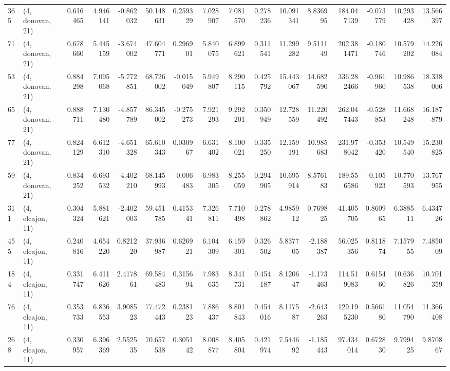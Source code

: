 \begin{tabular}{llrrrrrrrrrrrrrr}
365 &  (4, donovan, 21) &   0.616465 &   4.946141 &  -0.862032 &    50.148631 &   0.259329 &   7.028907 &   7.081570 &  0.278236 &  10.091341 &   8.836995 &   184.047139 & -0.073779 &  10.293428 &  13.566397 \\
71  &  (4, donovan, 21) &   0.678660 &   5.445159 &  -3.674002 &    47.604771 &   0.296901 &   5.840075 &   6.899621 &  0.311541 &  11.299282 &   9.511149 &   202.381471 & -0.180746 &  10.579202 &  14.226084 \\
53  &  (4, donovan, 21) &   0.884298 &   7.095068 &  -5.772851 &    68.726002 &  -0.015049 &   5.949807 &   8.290115 &  0.425792 &  15.443067 &  14.682590 &   336.282466 & -0.961960 &  10.986538 &  18.338006 \\
65  &  (4, donovan, 21) &   0.888711 &   7.130480 &  -4.857789 &    86.345002 &  -0.275273 &   7.921293 &   9.292201 &  0.350949 &  12.728559 &  11.220492 &   262.047443 & -0.528853 &  11.668248 &  16.187879 \\
77  &  (4, donovan, 21) &   0.824129 &   6.612310 &  -4.651328 &    65.610343 &   0.030967 &   6.631402 &   8.100021 &  0.335250 &  12.159191 &  10.985683 &   231.978042 & -0.353420 &  10.549540 &  15.230825 \\
59  &  (4, donovan, 21) &   0.834252 &   6.693532 &  -4.402210 &    68.145993 &  -0.006483 &   6.983305 &   8.255059 &  0.294905 &  10.695914 &   8.576183 &   189.556586 & -0.105923 &  10.770593 &  13.767955 \\
311 &  (4, elcajon, 11) &   0.304324 &   5.881621 &  -2.402003 &    59.451785 &   0.415341 &   7.326811 &   7.710498 &  0.278862 &   4.985912 &   0.769825 &    41.405705 &  0.860965 &   6.388511 &   6.434726 \\
455 &  (4, elcajon, 11) &   0.240816 &   4.654220 &   0.821220 &    37.936987 &   0.626921 &   6.104309 &   6.159301 &  0.326502 &   5.837705 &  -2.188387 &    56.025356 &  0.811874 &   7.157955 &   7.485009 \\
184 &  (4, elcajon, 11) &   0.331747 &   6.411626 &   2.417861 &    69.584483 &   0.315694 &   7.983635 &   8.341731 &  0.454187 &   8.120647 &  -1.173463 &   114.519083 &  0.615460 &  10.636826 &  10.701359 \\
76  &  (4, elcajon, 11) &   0.353733 &   6.836553 &   3.908523 &    77.472443 &   0.238123 &   7.886437 &   8.801843 &  0.454016 &   8.117587 &  -2.643263 &   129.195230 &  0.566180 &  11.054790 &  11.366408 \\
268 &  (4, elcajon, 11) &   0.330957 &   6.396369 &   2.552535 &    70.657538 &   0.305142 &   8.008877 &   8.405804 &  0.421974 &   7.544692 &  -1.185443 &    97.434014 &  0.672830 &   9.799425 &   9.870867 \\

\end{tabular}
